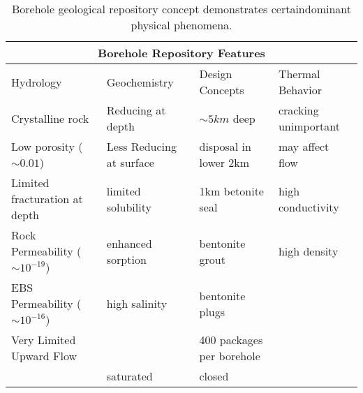 %
\begin{table}[h!]
  \centering
  \footnotesize{
  \begin{tabular}{|l|l|l|l|}
    \multicolumn{4}{c}{\textbf{Borehole Repository Features}}\\
    \hline
    Hydrology & Geochemistry & Design Concepts & Thermal Behavior \\ 
    \hline
    Crystalline rock&Reducing at depth& $\sim5km$ deep & cracking unimportant\\
    Low porosity ($\sim 0.01$)&Less Reducing at surface& disposal in lower 2km &may affect flow\\
    Limited fracturation at depth&limited solubility &1km betonite seal & high conductivity\\
    Rock Permeability ($\sim 10^{-19}$) &enhanced sorption &bentonite grout &high density\\
    EBS Permeability ($\sim 10^{-16}$) &high salinity&bentonite plugs&\\
    Very Limited Upward Flow&&400 packages per borehole&\\
    &saturated&closed&\\
    \hline
  \end{tabular}
  \caption[Borehole Repository Features]{Borehole geological repository 
  concept demonstrates certaindominant physical phenomena. }
  \label{tab:borehole_tab}
  }
\end{table}
